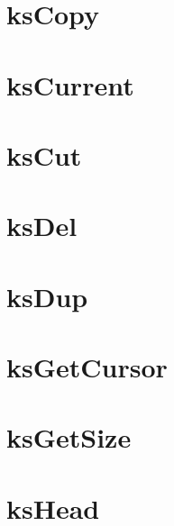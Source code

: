 \let\mypdfximage\pdfximage\def\pdfximage{\immediate\mypdfximage}\documentclass[twoside]{book}
\newcommand{\+}{\discretionary{\mbox{\scriptsize$\hookleftarrow$}}{}{}}
\begin{document}
\chapter{ks\+Copy}
\label{doc_contrib_api_reviews_core_ksCopy_md}

\chapter{ks\+Current}
\label{doc_contrib_api_reviews_core_ksCurrent_md}

\chapter{ks\+Cut}
\label{doc_contrib_api_reviews_core_ksCut_md}

\chapter{ks\+Del}
\label{doc_contrib_api_reviews_core_ksDel_md}

\chapter{ks\+Dup}
\label{doc_contrib_api_reviews_core_ksDup_md}

\chapter{ks\+Get\+Cursor}
\label{doc_contrib_api_reviews_core_ksGetCursor_md}

\chapter{ks\+Get\+Size}
\label{doc_contrib_api_reviews_core_ksGetSize_md}

\chapter{ks\+Head}
\label{doc_contrib_api_reviews_core_ksHead_md}

\end{document}
